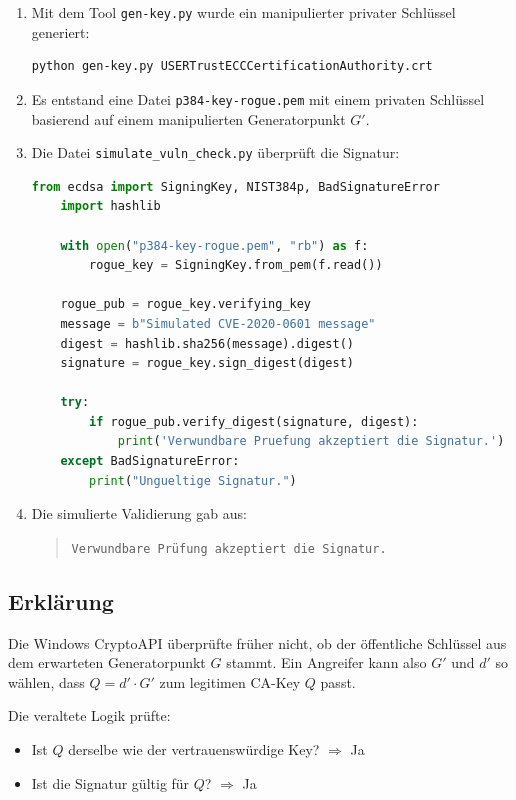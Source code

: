 \documentclass{article}
\begin{document}
\begin{enumerate}
    \item Mit dem Tool \texttt{gen-key.py} wurde ein manipulierter privater Schlüssel generiert:
    \begin{lstlisting}[language=bash]
    python gen-key.py USERTrustECCCertificationAuthority.crt
    \end{lstlisting}

    \item Es entstand eine Datei \texttt{p384-key-rogue.pem} mit einem privaten Schlüssel basierend auf einem manipulierten Generatorpunkt $G'$.

    \item Die Datei \texttt{simulate\_vuln\_check.py} überprüft die Signatur:
    \begin{lstlisting}[language=Python]
    from ecdsa import SigningKey, NIST384p, BadSignatureError
    import hashlib

    with open("p384-key-rogue.pem", "rb") as f:
        rogue_key = SigningKey.from_pem(f.read())

    rogue_pub = rogue_key.verifying_key
    message = b"Simulated CVE-2020-0601 message"
    digest = hashlib.sha256(message).digest()
    signature = rogue_key.sign_digest(digest)

    try:
        if rogue_pub.verify_digest(signature, digest):
            print('Verwundbare Pruefung akzeptiert die Signatur.')
    except BadSignatureError:
        print("Ungueltige Signatur.")
    \end{lstlisting}

    \item Die simulierte Validierung gab aus:
    \begin{quote}
    \texttt{Verwundbare Prüfung akzeptiert die Signatur.}
    \end{quote}
\end{enumerate}

\subsection*{Erklärung}

Die Windows CryptoAPI überprüfte früher nicht, ob der öffentliche Schlüssel aus dem erwarteten Generatorpunkt $G$ stammt. Ein Angreifer kann also $G'$ und $d'$ so wählen, dass $Q = d' \cdot G'$ zum legitimen CA-Key $Q$ passt.

Die veraltete Logik prüfte:
\begin{itemize}
    \item Ist $Q$ derselbe wie der vertrauenswürdige Key? $\Rightarrow$ Ja
    \item Ist die Signatur gültig für $Q$? $\Rightarrow$ Ja
\end{itemize}
\end{document}
